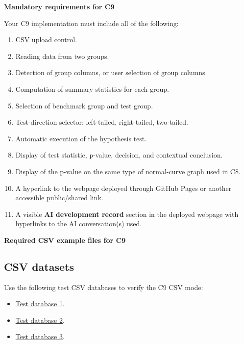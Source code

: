 \documentclass[12pt]{article}
\newcommand{\SubsectionBox}[1]{%
	\noindent\colorbox{gray!30}{%
		\parbox{\linewidth}{\textbf{#1}}%
	}\par\vspace{0.35cm}%
}
\begin{document}
	\SubsectionBox{Mandatory requirements for C9}
	Your C9 implementation must include all of the following:
	\begin{enumerate}
		\item CSV upload control.
		\item Reading data from two groups.
		\item Detection of group columns, or user selection of group columns.
		\item Computation of summary statistics for each group.
		\item Selection of benchmark group and test group.
		\item Test-direction selector: left-tailed, right-tailed, two-tailed.
		\item Automatic execution of the hypothesis test.
		\item Display of test statistic, p-value, decision, and contextual conclusion.
		\item Display of the p-value on the same type of normal-curve graph used in C8.
		\item A hyperlink to the webpage deployed through GitHub Pages or another accessible public/shared link.
		\item A visible \textbf{AI development record} section in the deployed webpage with hyperlinks to the AI conversation(s) used.
	\end{enumerate}
	
	\SubsectionBox{Required CSV example files for C9}
	
	\subsection*{CSV datasets}

	Use the following test CSV databases to verify the C9 CSV mode:
	\begin{itemize}
		\item \href{https://correosanbartoloedu-my.sharepoint.com/:x:/g/personal/nicolas_lopez_sanbartolo_edu_co/IQDrjLHubKjOSrn8CecqSvt6Ab8uVPrlO_6yx6cuRO0WHpY?e=Lokwys}{Test database 1}.
		\item \href{https://correosanbartoloedu-my.sharepoint.com/:x:/g/personal/nicolas_lopez_sanbartolo_edu_co/IQB0v-LRl2wBSYBW3kW1PdmuAZaRhLywPzOwclnt5ntUEXY?e=fjMM2j}{Test database 2}.
		\item \href{https://correosanbartoloedu-my.sharepoint.com/:x:/g/personal/nicolas_lopez_sanbartolo_edu_co/IQDrjLHubKjOSrn8CecqSvt6Ab8uVPrlO_6yx6cuRO0WHpY?e=MUj6aF}{Test database 3}.
	\end{itemize}
\end{document}
